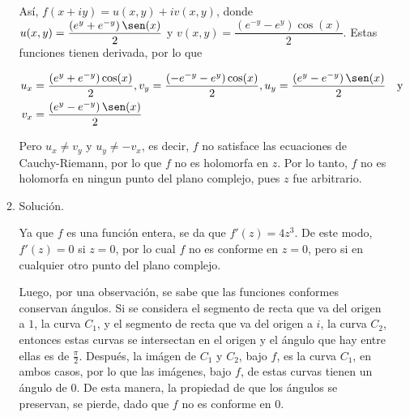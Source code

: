 \documentclass[12pt, fleqn]{article}
\newcommand{\complejos}{\mathbb{C}}
\begin{document}
\begin{enumerate}
\begin{enumerate}
			Así, $ f(x + iy) = u(x, y) + iv(x,y) $, donde $ u(x,y) = \dfrac{\left( e^{y} + e^{-y} \right) \sen(x)}{2} $ y \newline $ v(x,y) = \dfrac{\left( e^{-y} - e^{y} \right) \cos(x)}{2} $. Estas funciones tienen derivada, por lo que

			\begin{align*}
				u_x &= \dfrac{\left( e^{y} + e^{-y} \right) \cos(x)}{2}, v_y = \dfrac{\left( -e^{-y} - e^{y} \right) \cos(x)}{2}, u_y = \dfrac{\left( e^{y} - e^{-y} \right) \sen(x)}{2} \quad \mbox{y} \\
				v_x &= \dfrac{\left( e^{y} - e^{-y} \right) \sen(x)}{2}
			\end{align*}

			Pero $ u_x \neq v_y $ y $ u_y \neq -v_x $, es decir, $f$ no satisface las ecuaciones de Cauchy-Riemann, por lo que $f$ no es holomorfa en $z$. Por lo tanto, $f$ no es holomorfa en ningun punto del plano complejo, pues $z$ fue arbitrario.

			\item Solución.
			
			Ya que $f$ es una función entera, se da que $ f'(z) = 4z^3 $. De este modo, $ f'(z) = 0 $ si $ z = 0 $, por lo cual $f$ no es conforme en $ z = 0 $, pero si en cualquier otro punto del plano complejo.

			Luego, por una observación, se sabe que las funciones conformes conservan ángulos. Si se considera el segmento de recta que va del origen a $1$, la curva $ C_1 $, y el segmento de recta que va del origen a $i$, la curva $ C_2 $, entonces estas curvas se intersectan en el origen y el ángulo que hay entre ellas es de $ \frac{\pi}{2} $. Después, la imágen de $ C_1 $ y $ C_2 $, bajo $f$, es la curva $ C_1 $, en ambos casos, por lo que las imágenes, bajo $f$, de estas curvas tienen un ángulo de $0$. De esta manera, la propiedad de que los ángulos se preservan, se pierde, dado que $f$ no es conforme en $0$.

		\end{enumerate}
	\end{enumerate}
\end{document}
